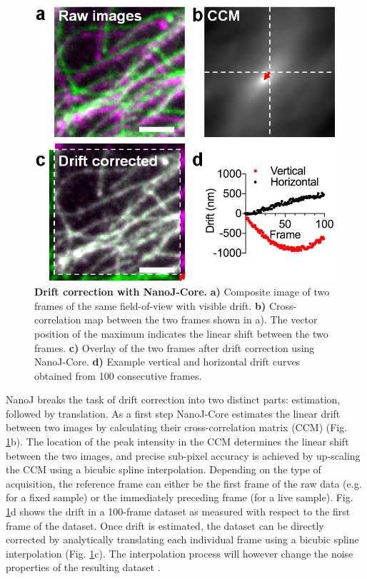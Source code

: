  \begin{figure}[!t]
    \centering
    \includegraphics[width=\linewidth]{Figures/FigureDrift_v2.png}
    \caption{\textbf{Drift correction with NanoJ-Core.} \textbf{a)} Composite image of two frames of the same field-of-view with visible drift. \textbf{b)} Cross-correlation map between the two frames shown in a). The vector position of the maximum indicates the linear shift between the two frames. \textbf{c)} Overlay of the two frames after drift correction using NanoJ-Core. \textbf{d)} Example vertical and horizontal drift curves obtained from 100 consecutive frames.}
    \label{fig:DriftCorrection}
 \end{figure}

 NanoJ breaks the task of drift correction into two distinct parts: estimation, followed by translation. As a first step NanoJ-Core estimates the linear drift between two images by calculating their cross-correlation matrix (CCM) (Fig. \ref{fig:DriftCorrection}b). The location of the peak intensity in the CCM determines the linear shift between the two images, and precise sub-pixel accuracy is achieved by up-scaling the CCM using a bicubic spline interpolation. Depending on the type of acquisition, the reference frame can either be the first frame of the raw data (e.g. for a fixed sample) or the immediately preceding frame (for a live sample). Fig. \ref{fig:DriftCorrection}d shows the drift in a 100-frame dataset as measured with respect to the first frame of the dataset. Once drift is estimated, the dataset can be directly corrected by analytically translating each individual frame using a bicubic spline interpolation (Fig. \ref{fig:DriftCorrection}c). The interpolation process will however change the noise properties of the resulting dataset \cite{blaysat2016effect}.
 
